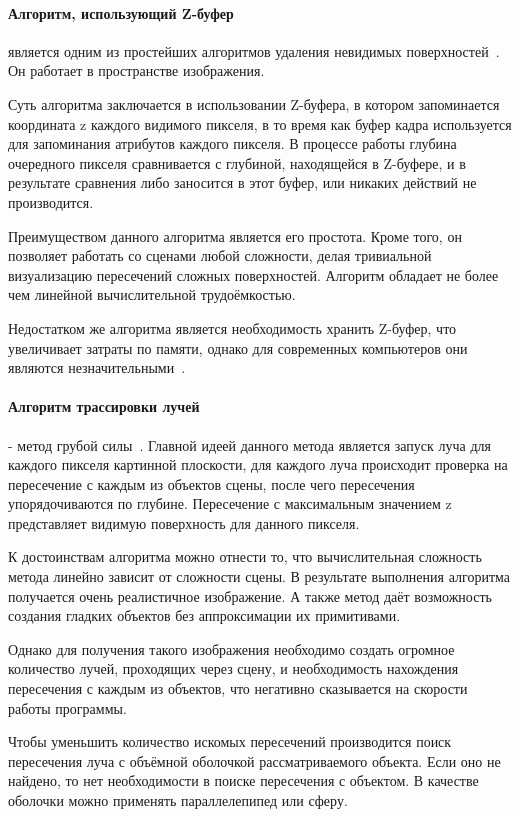 \paragraph{Алгоритм, использующий Z-буфер} является одним из простейших алгоритмов удаления невидимых поверхностей~\cite{rogers}. Он работает в пространстве изображения. 
\par Суть алгоритма заключается в использовании Z-буфера, в котором запоминается координата z каждого видимого пикселя, в то время как буфер кадра используется для запоминания атрибутов каждого пикселя. В процессе работы глубина очередного пикселя сравнивается с глубиной, находящейся в Z-буфере, и в результате сравнения либо заносится в этот буфер, или никаких действий не производится.
\par Преимуществом данного алгоритма является его простота. Кроме того, он позволяет работать со сценами любой сложности, делая тривиальной визуализацию пересечений сложных поверхностей. Алгоритм обладает не более чем линейной вычислительной трудоёмкостью.
\par Недостатком же алгоритма является необходимость хранить Z-буфер, что увеличивает затраты по памяти, однако для современных компьютеров они являются незначительными~\cite{rogers}.

\paragraph{Алгоритм трассировки лучей} - метод грубой силы~\cite{rogers}. Главной идеей данного метода является запуск луча для каждого пикселя картинной плоскости, для каждого луча происходит проверка на пересечение с каждым из объектов сцены, после чего пересечения упорядочиваются по глубине. Пересечение с максимальным значением z представляет видимую поверхность для данного пикселя.
\par К достоинствам алгоритма можно отнести то, что вычислительная сложность метода линейно зависит от сложности сцены. В результате выполнения алгоритма получается очень реалистичное изображение. А также метод даёт возможность создания гладких объектов без аппроксимации их примитивами.
\par Однако для получения такого изображения необходимо создать огромное количество лучей, проходящих через сцену, и необходимость нахождения пересечения с каждым из объектов, что негативно сказывается на скорости работы программы.
\par Чтобы уменьшить количество искомых пересечений производится поиск пересечения луча с объёмной оболочкой рассматриваемого объекта. Если оно не найдено, то нет необходимости в поиске пересечения с объектом. В качестве оболочки можно применять параллелепипед или сферу.
